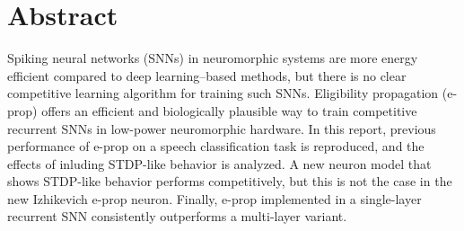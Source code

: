 \begingroup
\let\clearpage\relax
\let\cleardoublepage\relax
\let\cleardoublepage\relax

\chapter*{Abstract}
Spiking neural networks (SNNs) in neuromorphic systems are more energy efficient compared to deep learning--based methods, but there is no clear competitive learning algorithm for training such SNNs.
Eligibility propagation (e-prop) offers an efficient and biologically plausible way to train competitive recurrent SNNs in low-power neuromorphic hardware.
In this report, previous performance of e-prop on a speech classification task is reproduced, and the effects of inluding STDP-like behavior is analyzed.
A new neuron model that shows STDP-like behavior performs competitively, but this is not the case in the new Izhikevich e-prop neuron.
Finally, e-prop implemented in a single-layer recurrent SNN consistently outperforms a multi-layer variant.

\endgroup

\vfill
